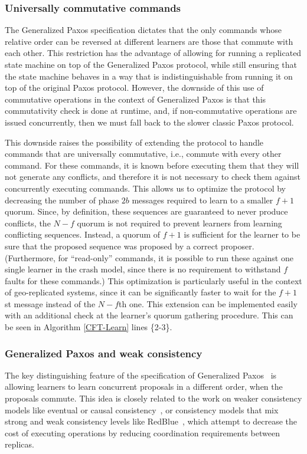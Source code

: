 \subsubsection{Universally commutative commands}
The Generalized Paxos specification dictates that the only commands whose relative order can be reversed at different learners are those that commute with each other. This restriction has the advantage of allowing for running a replicated state machine on top of the Generalized Paxos protocol, while still ensuring that the state machine behaves in a way that is indistinguishable from running it on top of the original Paxos protocol. However, the downside of this use of commutative operations in the context of Generalized Paxos is that this commutativity check is done at runtime, and, if non-commutative operations are issued concurrently, then we must fall back to the slower classic Paxos protocol.\par
This downside raises the possibility of extending the protocol to handle commands that are universally commutative, i.e., commute with every other command. For these commands, it is known before executing them that they will not generate any conflicts, and therefore it is not necessary to check them against concurrently executing commands. This allows us to optimize the protocol by decreasing the number of phase $2b$ messages required to learn to a smaller $f+1$ quorum. Since, by definition, these sequences are guaranteed to never produce conflicts, the $N-f$ quorum is not required to prevent learners from learning conflicting sequences. Instead, a quorum of $f+1$ is sufficient for the learner to be sure that the proposed sequence was proposed by a correct proposer. (Furthermore, for ``read-only'' commands, it is possible to run these against one single learner in the crash model, since there is no requirement to withstand $f$ faults for these commands.) This optimization is particularly useful in the context of geo-replicated systems, since it can be significantly faster to wait for the $f+1$st message instead of the $N-f$th one. This extension can be implemented easily with an additional check at the learner's quorum gathering procedure. This can be seen in Algorithm \ref{CFT-Learn} lines \{2-3\}.

\subsubsection{Generalized Paxos and weak consistency}
The key distinguishing feature of the specification of Generalized Paxos~\cite{Lamport2005} is allowing learners to learn concurrent proposals in a different order, when the proposals commute. This idea is closely related to the work on weaker consistency models like eventual or causal consistency~\cite{Ahamad1995}, or consistency models that mix
strong and weak consistency levels like RedBlue~\cite{Li2012}, which attempt to decrease the cost of executing operations by reducing coordination requirements between replicas. 

